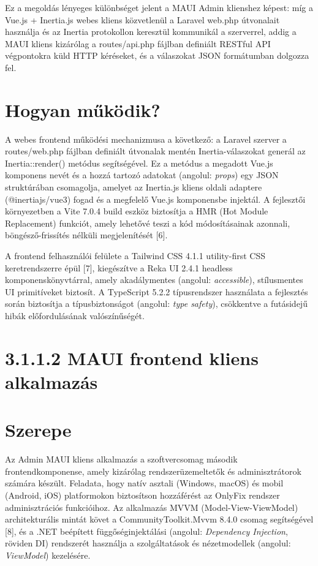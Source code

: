 Ez a megoldás lényeges különbséget jelent a MAUI Admin klienshez képest: míg a Vue.js + Inertia.js webes kliens közvetlenül a Laravel web.php útvonalait használja és az Inertia protokollon keresztül kommunikál a szerverrel, addig a MAUI kliens kizárólag a routes/api.php fájlban definiált RESTful API végpontokra küld HTTP kéréseket, és a válaszokat JSON formátumban dolgozza fel.

\section{Hogyan működik?}\label{hogyan-mux171kuxf6dik}

A webes frontend működési mechanizmusa a következő: a Laravel szerver a routes/web.php fájlban definiált útvonalak mentén Inertia-válaszokat generál az Inertia::render() metódus segítségével. Ez a metódus a megadott Vue.js komponens nevét és a hozzá tartozó adatokat (angolul: \emph{props}) egy JSON struktúrában csomagolja, amelyet az Inertia.js kliens oldali adaptere (@inertiajs/vue3) fogad és a megfelelő Vue.js komponensbe injektál. A fejlesztői környezetben a Vite 7.0.4 build eszköz biztosítja a HMR (Hot Module Replacement) funkciót, amely lehetővé teszi a kód módosításainak azonnali, böngésző-frissítés nélküli megjelenítését {[}6{]}.

A frontend felhasználói felülete a Tailwind CSS 4.1.1 utility-first CSS keretrendszerre épül {[}7{]}, kiegészítve a Reka UI 2.4.1 headless komponenskönyvtárral, amely akadálymentes (angolul: \emph{accessible}), stílusmentes UI primitíveket biztosít. A TypeScript 5.2.2 típusrendszer használata a fejlesztés során biztosítja a típusbiztonságot (angolul: \emph{type safety}), csökkentve a futásidejű hibák előfordulásának valószínűségét.

\section{3.1.1.2 MAUI frontend kliens alkalmazás}\label{maui-frontend-kliens-alkalmazuxe1s}

\section{Szerepe}\label{szerepe}

Az Admin MAUI kliens alkalmazás a szoftvercsomag második frontendkomponense, amely kizárólag rendszerüzemeltetők és adminisztrátorok számára készült. Feladata, hogy natív asztali (Windows, macOS) és mobil (Android, iOS) platformokon biztosítson hozzáférést az OnlyFix rendszer adminisztrációs funkcióihoz. Az alkalmazás MVVM (Model-View-ViewModel) architekturális mintát követ a CommunityToolkit.Mvvm 8.4.0 csomag segítségével {[}8{]}, és a .NET beépített függőséginjektálási (angolul: \emph{Dependency Injection}, röviden DI) rendszerét használja a szolgáltatások és nézetmodellek (angolul: \emph{ViewModel}) kezelésére.

